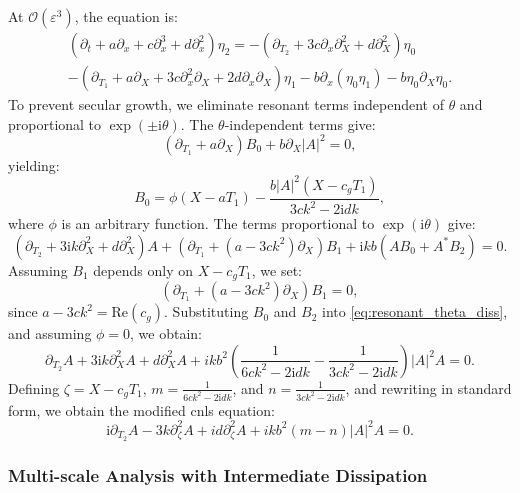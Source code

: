 \documentclass[alpha-refs, 12pt]{wiley-article}
\renewcommand{\O}{\mathcal{O}}
\newcommand{\ui}{\mathrm{i}}
\newcommand{\eps}{\varepsilon}
\begin{document}
At $\O(\eps^3)$, the equation is:
\begin{multline}
\label{eq:third_order_diss}
\left( \partial_t + a \partial_x + c \partial_x^3 + d \partial_x^2 \right) \eta_2 = - \left( \partial_{T_2} + 3 c \partial_x \partial_X^2 + d \partial_X^2 \right) \eta_0 \\
- \left( \partial_{T_1} + a \partial_X + 3 c \partial_x^2 \partial_X + 2 d \partial_x \partial_X \right) \eta_1 - b \partial_x ( \eta_0 \eta_1 ) - b \eta_0 \partial_X \eta_0.
\end{multline}
To prevent secular growth, we eliminate resonant terms independent of $\theta$ and proportional to $\exp(\pm \ui \theta)$. The $\theta$-independent terms give:
\begin{equation}
\label{eq:B0_equation_diss}
  \left( \partial_{T_1} + a \partial_X \right) B_0 + b \partial_X |A|^2 = 0,
\end{equation}
yielding:
\[
  B_0 = \phi(X - a T_1) - \frac{b |A|^2 (X - c_g T_1)}{3 c k^2 - 2 \ui d k},
\]
where $\phi$ is an arbitrary function. The terms proportional to $\exp(\ui \theta)$ give:
\begin{equation}\label{eq:resonant_theta_diss}
  \left( \partial_{T_2} + 3 \ui k \partial_X^2 + d \partial_X^2 \right) A + \left( \partial_{T_1} + (a - 3 c k^2) \partial_X \right) B_1 + \ui k b \left( A B_0 + A^* B_2 \right) = 0.
\end{equation}
Assuming $B_1$ depends only on $X - c_g T_1$, we set:
\[
\left( \partial_{T_1} + (a - 3 c k^2) \partial_X \right) B_1 = 0,
\]
since $a - 3 c k^2 = \text{Re}(c_g)$. Substituting $B_0$ and $B_2$ into \eqref{eq:resonant_theta_diss}, and assuming $\phi = 0$, we obtain:
\begin{equation*}%
  \partial_{T_2} A + 3 \ui k \partial_X^2 A + d \partial_X^2 A + i k b^2 \left( \frac{1}{6 c k^2 - 2 \ui d k} - \frac{1}{3 c k^2 - 2 \ui d k} \right) |A|^2 A = 0.
\end{equation*}
Defining $\zeta = X - c_g T_1$, $m = \frac{1}{6 c k^2 - 2 \ui d k}$, and $n = \frac{1}{3 c k^2 - 2 \ui d k}$, and rewriting in standard form, we obtain the modified \acrshort{cnls} equation:
\begin{equation}\label{eq:NLS_final_diss}
  \ui \partial_{T_2} A - 3 k \partial_\zeta^2 A + i d \partial_\zeta^2 A + i k b^2 (m - n) |A|^2 A = 0.
\end{equation}

\subsubsection{Multi-scale Analysis with Intermediate Dissipation}
\end{document}
